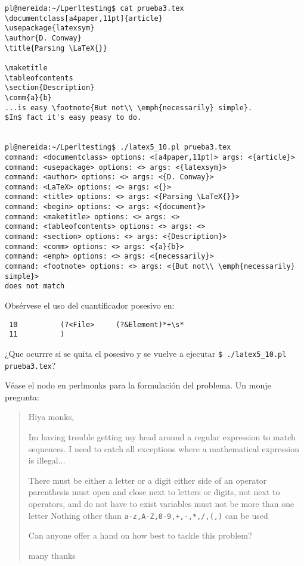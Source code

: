 \begin{verbatim}
pl@nereida:~/Lperltesting$ cat prueba3.tex
\documentclass[a4paper,11pt]{article}
\usepackage{latexsym}
\author{D. Conway}
\title{Parsing \LaTeX{}}

\maketitle
\tableofcontents
\section{Description}
\comm{a}{b}
...is easy \footnote{But not\\ \emph{necessarily} simple}.
$In$ fact it's easy peasy to do.


pl@nereida:~/Lperltesting$ ./latex5_10.pl prueba3.tex
command: <documentclass> options: <[a4paper,11pt]> args: <{article}>
command: <usepackage> options: <> args: <{latexsym}>
command: <author> options: <> args: <{D. Conway}>
command: <LaTeX> options: <> args: <{}>
command: <title> options: <> args: <{Parsing \LaTeX{}}>
command: <begin> options: <> args: <{document}>
command: <maketitle> options: <> args: <>
command: <tableofcontents> options: <> args: <>
command: <section> options: <> args: <{Description}>
command: <comm> options: <> args: <{a}{b}>
command: <emph> options: <> args: <{necessarily}>
command: <footnote> options: <> args: <{But not\\ \emph{necessarily} simple}>
does not match
\end{verbatim}

\begin{exercise}
Obsérvese el uso del cuantificador posesivo en:
\begin{verbatim}
 10          (?<File>     (?&Element)*+\s*
 11          )
\end{verbatim}
¿Que ocurrre si se quita el posesivo 
y se vuelve a ejecutar \verb|$ ./latex5_10.pl prueba3.tex|?
\end{exercise}


Véase el nodo 
en perlmonks
para la formulación del problema. Un monje pregunta:

\begin{it}\begin{quotation} 
Hiya monks,

Im having trouble getting my head around a regular expression to match sequences.
I need to catch all exceptions where a mathematical expression is illegal...

There must be either a letter or a digit either side of an operator
parenthesis must open and close next to letters or digits, not next to operators, and do not have to exist
variables must not be more than one letter
Nothing other than \verb|a-z,A-Z,0-9,+,-,*,/,(,)| can be used

Can anyone offer a hand on how best to tackle this problem?

many thanks 
\end{quotation}\end{it} 


